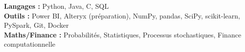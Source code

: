 \textbf{Langages :} Python, Java, C, SQL\\
\textbf{Outils :} Power BI, Alteryx (préparation), NumPy, pandas, SciPy, scikit-learn, PySpark, Git, Docker\\
\textbf{Maths/Finance :} Probabilités, Statistiques, Processus stochastiques, Finance computationnelle
